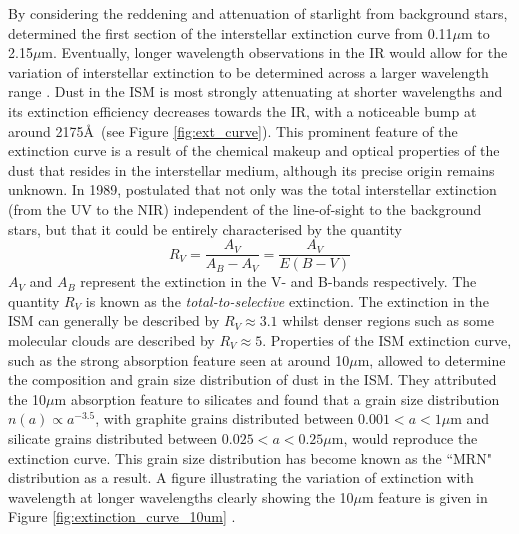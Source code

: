 By considering the reddening and attenuation of starlight from background stars,  \citet{Bless1972} determined the first section of the interstellar extinction curve from 0.11$\mu$m to 2.15$\mu$m.  Eventually, longer wavelength observations in the IR would allow for the variation of interstellar extinction to be determined across a larger  wavelength range \citep{Rieke1985}.  Dust in the ISM is most strongly attenuating at shorter wavelengths and its extinction efficiency decreases towards the IR, with a noticeable bump at around 2175\AA\ (see Figure \ref{fig:ext_curve}). This prominent feature of the extinction curve is a result of the chemical makeup and optical properties of the dust that resides in the interstellar medium, although its precise origin remains unknown.  In 1989, \citeauthor*{Cardelli1989} postulated that not only was the total interstellar extinction (from the UV to the NIR) independent of the line-of-sight to the background stars, but that it could be entirely characterised by the quantity
\begin{equation}
R_V=\frac{A_V}{A_B-A_V}=\frac{A_V}{E(B-V)}
\end{equation}
\noindent $A_V$ and $A_B$ represent the extinction in the V- and B-bands respectively. The quantity $R_V$ is known as the {\em total-to-selective} extinction.  The extinction in the ISM can generally be described by $R_V\approx3.1$ whilst denser regions such as some molecular clouds are described by $R_V\approx5$.  Properties of the ISM extinction curve, such as the strong absorption feature seen at around 10$\mu$m, allowed \citet*{Mathis1977} to determine the composition and grain size distribution of dust in the ISM.  They attributed the 10$\mu$m absorption feature to silicates and found that a grain size distribution $n(a) \propto a^{-3.5}$, with graphite grains distributed between $0.001<a<1\mu$m and silicate grains distributed between $0.025<a<0.25\mu$m, would reproduce the extinction curve.  This grain size distribution has become known as the ``MRN" distribution as a result.    A figure illustrating the variation of extinction with wavelength at longer wavelengths clearly showing the 10$\mu$m feature is given in Figure \ref{fig:extinction_curve_10um} \citep{Weingartner2001,Draine2003}.


